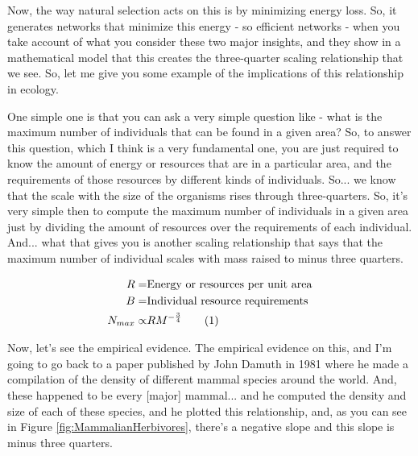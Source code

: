 \documentclass[]{article}
\newcommand\numberthis{\addtocounter{equation}{1}\tag{\theequation}}
\begin{document}
Now, the way natural selection
acts on this is
by minimizing energy loss.
So, it generates networks
that minimize this energy -
so efficient networks -
when you take account of what
you consider these two major insights,
and they show
in a mathematical model
that this creates the three-quarter
scaling relationship that we see.
So, let me give you some example
of the implications of this relationship
in ecology.

One simple one is that you can ask
a very simple question like -
what is the maximum number
of individuals
that can be found in a given area?
So, to answer this question,
which I think is a very fundamental one,
you are just required to know
the amount of energy or resources
that are in a particular area,
and the requirements of those resources
by different kinds of individuals.
So... we know that the scale
with the size of the organisms
rises through three-quarters.
So, it's very simple then to compute
the maximum number of individuals
in a given area
just by dividing the amount of resources
over the requirements of each individual.
And... what that gives you is
another scaling relationship
that says that the maximum number
of individual scales with mass
raised to minus three quarters.

\begin{align*}
	R=& \text{Energy or resources per unit area}\\
	B=&\text{Individual resource requirements}\\
	N_{max}\propto& R M^{-\frac{3}{4}}\label{eq:max}\numberthis
\end{align*}

Now, let's see the empirical evidence.
The empirical evidence on this,
and I'm going to go back
to a paper published by
John Damuth in 1981
where he made a compilation
of the density
of different mammal species
around the world.
And, these happened to be
every [major] mammal...
and he computed the density
and size of each of these species,
and he plotted this relationship,
and, as you can see in  Figure \ref{fig:MammalianHerbivores},
there's a negative slope and
this slope is minus three quarters.
\end{document}
